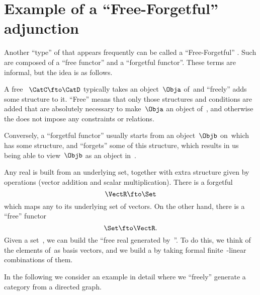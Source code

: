 
\section[Free-forgetful adjunction]{Example of a ``Free-Forgetful'' adjunction}
\label{sec:free-forgetful-adjunction-graph-example}

Another ``type'' of  that appears frequently can be called a ``Free-Forgetful'' .
Such  are composed of a ``free functor'' and a ``forgetful functor''.
These terms are informal, but the idea is as follows.

A free ~$\CatC \fto \CatD$ typically takes an object~$\Obja$ of~\CatC and ``freely'' adds some structure to it.
``Free'' means that only those structures and conditions are added that are absolutely necessary to make~$\Obja$ an object of~\CatD, and otherwise the  does not impose any constraints or relations.

Conversely, a ``forgetful functor'' usually starts from an object~$\Objb$ on~\CatD which has some structure, and ``forgets'' some of this structure, which results in us being able to view~$\Objb$ as an object in~\CatC.

\begin{example}
Any real  is built from an underlying set, together with extra structure given by operations (vector addition and scalar multiplication).
There is a forgetful 
\begin{equation}\label{eq:forgetful-functor-from-VectR}
\VectR \fto \Set
\end{equation}
which maps any  to its underlying set of vectors.
On the other hand, there is a ``free'' functor 
\begin{equation}\label{eq:free-functor-to-VectR}
\Set \fto \VectR. 
\end{equation}
Given a set~\setA, we can build the ``free real  generated by~\setA''.
To do this, we think of the elements of~\setA as basis vectors, and we build a  by taking formal finite~\reals-linear combinations of them.
\end{example}

In the following we consider an example in detail where we ``freely'' generate a category from a directed graph.

